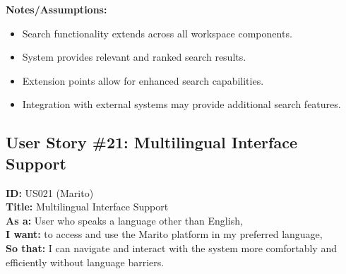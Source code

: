 \documentclass[12pt]{article}
\begin{document}
\vspace{1em}
\textbf{Notes/Assumptions:}
\begin{itemize}
    \item Search functionality extends across all workspace components.
    \item System provides relevant and ranked search results.
    \item Extension points allow for enhanced search capabilities.
    \item Integration with external systems may provide additional search features.
\end{itemize}


\subsection{User Story \#21: Multilingual Interface Support}
\textbf{ID:} US021 (Marito) \\
\textbf{Title:} Multilingual Interface Support \\
\textbf{As a:} User who speaks a language other than English, \\
\textbf{I want:} to access and use the Marito platform in my preferred language, \\
\textbf{So that:} I can navigate and interact with the system more comfortably and efficiently without language barriers.
\end{document}
